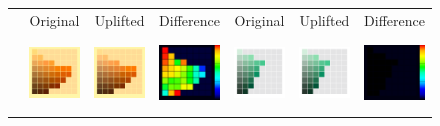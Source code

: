\begin{figure}[ht!]
	\centering
	{\sffamily
		\setlength\tabcolsep{0.0pt}
		\begin{tabular}{ccccccc}
			&Original& Uplifted & Difference &\quad Original & Uplifted & Difference
			\vspace{1em} \\ 
			\raisebox{0.4cm}[0pt][0pt]{\parbox[c][0pt][c]{0cm}{\hspace{-1.5em}\\[20pt]}\par}
			&\includegraphics[width=.15\linewidth]{img/results_uplift_page04_originalFL3.png}
			&
			\includegraphics[width=.15\linewidth]{img/results_uplift_page04_sigmoidFL3.png}
			& 
			\includegraphics[width=.15\linewidth,height=5.25em]{img/results_uplift_page04_diff_sigmoidFL3.png}
			&\quad
			\includegraphics[width=.15\linewidth]{img/results_uplift_page18_originalD65.png}
			&
			\includegraphics[width=.15\linewidth]{img/results_uplift_page18_sigmoidD65.png}
			&
			\includegraphics[width=.15\linewidth,height=5.25em]{img/results_uplift_page18_diff_sigmoidD65.png}

\end{tabular}}
\end{figure}
